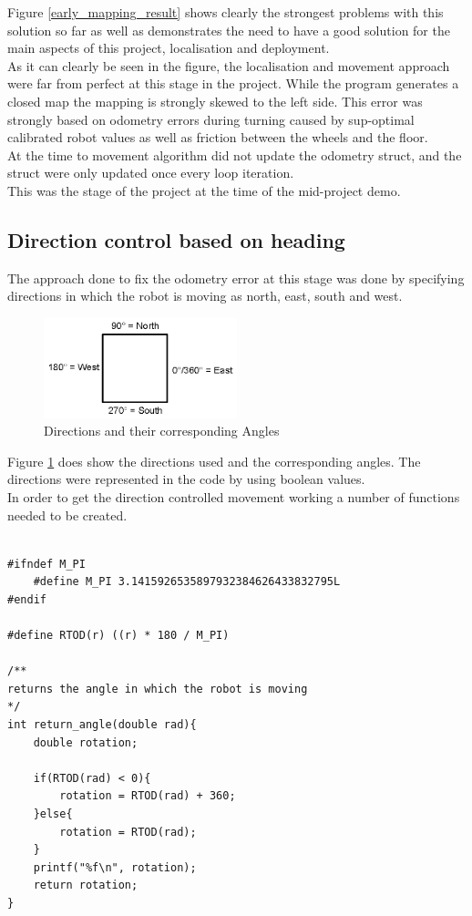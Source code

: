 Figure \ref{early_mapping_result} shows clearly the strongest problems with this solution so far as well as demonstrates the need to have a good solution for  the main aspects of this project, localisation and deployment.\\
As it can clearly be seen in the figure, the localisation and movement approach were far from perfect at this stage in the project.
While the program generates a closed  map the mapping is strongly skewed to the left side. This error was strongly based on odometry errors during turning caused by sup-optimal calibrated robot values as well as friction between the wheels and the floor.\\
At the time to movement algorithm did not update the odometry struct, and the struct were only updated once every loop iteration. \\
This was the stage of the project at the time of the mid-project demo.


\subsection{Direction control based on heading}
The approach done to fix the odometry error at this stage was done by specifying directions in which the robot is moving as north, east, south and west.

\begin{figure}[h]
\centering
\includegraphics[width = 0.5\textwidth]{../../figures/direction_and_angles}
\caption{Directions and their corresponding Angles}
\label{directions_and_angles}
\end{figure}

Figure \ref{directions_and_angles} does show the directions used and the corresponding angles. The directions were represented in the code by using boolean values. \\
In order to get the direction controlled movement working a number of functions needed to be created. 

\begin{lstlisting}[caption={Converting Radians to degrees}]

#ifndef M_PI
    #define M_PI 3.1415926535897932384626433832795L
#endif

#define RTOD(r) ((r) * 180 / M_PI)

/**
returns the angle in which the robot is moving
*/
int return_angle(double rad){
    double rotation;

    if(RTOD(rad) < 0){
        rotation = RTOD(rad) + 360;
    }else{
        rotation = RTOD(rad);
    }
    printf("%f\n", rotation);
    return rotation;
}
\end{lstlisting}

